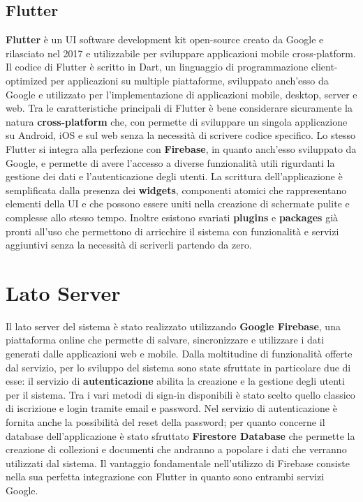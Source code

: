 \documentclass[12pt,a4paper,twoside,openright,titlepage]{book}
\begin{document}
\subsection{Flutter}
\textbf{Flutter} è un UI software development kit open-source creato da Google e rilasciato nel 2017 e utilizzabile per sviluppare applicazioni mobile cross-platform. Il codice di Flutter è scritto in Dart, un linguaggio di programmazione client-optimized per applicazioni su multiple piattaforme, sviluppato anch'esso da Google e utilizzato per l'implementazione di applicazioni mobile, desktop, server e web. Tra le caratteristiche principali di Flutter è bene considerare sicuramente la natura \textbf{cross-platform} che, con permette di sviluppare un singola applicazione su Android, iOS e sul web senza la necessità di scrivere codice specifico. Lo stesso Flutter si integra alla perfezione con \textbf{Firebase}, in quanto anch'esso sviluppato da Google, e permette di avere l'accesso a diverse funzionalità utili rigurdanti la gestione dei dati e l'autenticazione degli utenti. La scrittura dell'applicazione è semplificata dalla presenza dei \textbf{widgets}, componenti atomici che rappresentano elementi della UI e che possono essere uniti nella creazione di schermate pulite e complesse allo stesso tempo. Inoltre esistono svariati \textbf{plugins} e \textbf{packages} già pronti all'uso che permettono di arricchire il sistema con funzionalità e servizi aggiuntivi senza la necessità di scriverli partendo da zero.

\section{Lato Server}
Il lato server del sistema è stato realizzato utilizzando \textbf{Google Firebase}, una piattaforma online che permette di salvare, sincronizzare e utilizzare i dati generati dalle applicazioni web e mobile. Dalla moltitudine di funzionalità offerte dal servizio, per lo sviluppo del sistema sono state sfruttate in particolare due di esse: il servizio di \textbf{autenticazione} abilita la creazione e la gestione degli utenti per il sistema. Tra i vari metodi di sign-in disponibili è stato scelto quello classico di iscrizione e login tramite email e password. Nel servizio di autenticazione è fornita anche la possibilità del reset della password; per quanto concerne il database dell'applicazione è stato sfruttato \textbf{Firestore Database} che permette la creazione di collezioni e documenti che andranno a popolare i dati che verranno utilizzati dal sistema. Il vantaggio fondamentale nell'utilizzo di Firebase consiste nella sua perfetta integrazione con Flutter in quanto sono entrambi servizi Google.
\end{document}
